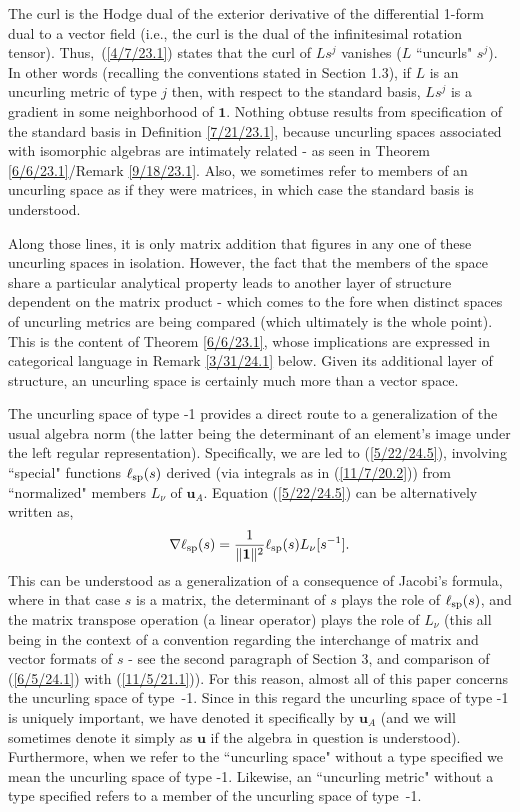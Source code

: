 \documentclass{amsart}
\numberwithin{equation}{section}
\theoremstyle{definition}
\numberwithin{theorem}{section}
\begin{document}
 The curl is the Hodge dual of the exterior derivative of the differential \mbox{1-form} dual to a vector field (i.e., the curl is the dual of the infinitesimal rotation tensor).  \mbox{Thus,  (\ref{4/7/23.1})} states that the curl of $Ls^j$ vanishes ($L$ ``uncurls" $s^j$).    In other words (recalling the conventions stated in Section 1.3), if $L$ is an uncurling metric of type $j$ then, with respect to the standard basis, $Ls^j$ is a gradient in some neighborhood of $\mathbf{1}$.   Nothing obtuse results from specification of the standard basis in Definition \ref{7/21/23.1}, because uncurling spaces associated with isomorphic algebras are intimately related - as seen in Theorem \ref{6/6/23.1}/Remark \ref{9/18/23.1}.  Also, we sometimes refer to members of an uncurling space as if they were matrices, in which case the standard basis is understood.
  
   Along those lines, it is only matrix addition that figures in any one of these uncurling spaces in isolation.  However, the fact that the members of the space share a particular analytical property leads to another layer of structure dependent on the matrix product - which comes to the fore when distinct spaces of uncurling metrics are being compared (which ultimately is the whole point).  This is the content of Theorem \ref{6/6/23.1}, whose implications are expressed in categorical language in Remark \ref{3/31/24.1} below. Given its additional layer of structure, an uncurling space is certainly much more than a vector space.
   
 The uncurling space of type -1 provides a direct route to a generalization of the usual algebra norm (the latter being the determinant of an element's image under the left regular representation).  Specifically, we are led to (\ref{5/22/24.5}),  involving ``special" functions $\ell_{\rm sp}(s)$ derived (via integrals as in (\ref{11/7/20.2})) from ``normalized" members $L_\nu$ of $\mathbf{u}_A$. Equation (\ref{5/22/24.5}) can be alternatively written as,  \begin{equation}\label{6/5/24.1} \nabla\ell_{\rm sp}(s) = \frac{1}{\|\mathbf{1}\|^{2}}\ell_{\rm sp}(s) L_{\nu}[s^{-1}].\end{equation} This can be understood as a generalization of a consequence of Jacobi's formula, where in that case $s$ is a matrix, the determinant of $s$ plays the role of $\ell_{\rm sp}(s)$, and the matrix transpose operation (a linear operator) plays the role of $L_\nu$ (this all being in the context of a convention regarding the interchange of matrix and vector formats of $s$  -  see the second paragraph of Section 3, and comparison of (\ref{6/5/24.1}) with (\ref{11/5/21.1})).
   For this reason, almost all of this paper concerns the uncurling space of \mbox{type -1}. Since in this regard the uncurling space of type -1 is uniquely important, we have denoted it specifically by $\mathbf{u}_A$ (and we will sometimes denote it simply as $\mathbf{u}$ if the algebra in question is understood).    Furthermore, when we refer to the ``uncurling space" without a type specified we mean the uncurling space of type -1.  Likewise, an ``uncurling metric" without a type specified refers to a member of the uncurling space of \mbox{type -1}. 
 
\end{document}

